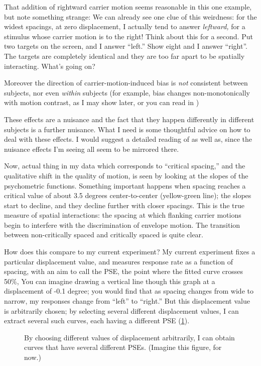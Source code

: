 \documentclass[english,noae]{article}
\begin{document}
That addition of rightward carrier motion seems reasonable in this
one example, but note something strange: We can already see one clue
of this weirdness: for the widest spacings, at zero displacement,
I actually tend to answer \emph{leftward, }for a stimulus whose carrier
motion is to the right! Think about this for a second. Put two targets
on the screen, and I answer ``left.'' Show eight and I answer ``right''.
The targets are completely identical and they are too far apart to
be spatially interacting. What's going on?

Moreover the direction of carrier-motion-induced bias is \emph{not}
consistent between subjects, nor even \emph{within} subjects (for
example, bias changes non-monotonically with motion contrast, as I
may show later, or you can read in ) 

These effects are a nuisance and the fact that they happen differently
in different subjects is a further nuisance. What I need is some thoughtful
advice on how to deal with these effects. I would suggest a detailed
reading of \citep{Murakami:1993vn}as well as\citet{Mareschal:2010fk},
since the nuisance effects I'm seeing all seem to be mirrored there.

Now, actual thing in my data which corresponds to ``critical spacing,''
and the qualitative shift in the quality of motion, is seen by looking
at the slopes of the psychometric functions. Something important happens
when spacing reaches a critical value of about 3.5 degrees center-to-center
(yellow-green line); the slopes start to decline, and they decline
further with closer spacings. This is the true measure of spatial
interactions: the spacing at which flanking carrier motions begin
to interfere with the discrimination of envelope motion. The transition
between non-critically spaced and critically spaced is quite clear.

How does this compare to my current experiment? My current experiment
fixes a particular displacement value, and measures response rate
as a function of spacing, with an aim to call the PSE, the point where
the fitted curve crosses 50\%, You can imagine drawing a vertical
line though this graph at a displacement of -0.1 degree; you would
find that as spacing changes from wide to narrow, my responses change
from ``left'' to ``right.'' But this displacement value is arbitrarily
chosen; by selecting several different displacement values, I can
extract several such curves, each having a different PSE (\ref{fig:arbitrary-pse}). 

\begin{figure}


\caption{\label{fig:arbitrary-pse}By choosing different values of displacement
arbitrarily, I can obtain curves that have several different PSEs.
(Imagine this figure, for now.)}


\end{figure}
\end{document}
